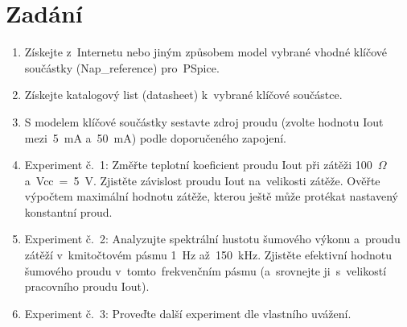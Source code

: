 \documentclass[12pt]{CLASS/protokol}
\begin{document}
\pagestyle{empty}           %
\clearpage                  %
\setcounter{page}{2}        %
\newpage                    %

\tableofcontents            %
\newpage
\clearpage\pagestyle{plain} %

\pagestyle{fancy}
\fancyhf{} %
\fancyhead[R]{\small\textcolor{black!85}{Zdroj proudu s vhodnou napěťovou referencí}} %
\fancyfoot[c]{-~\thepage~-} %
\renewcommand{\headrulewidth}{1pt}
\renewcommand{\footrulewidth}{1pt}


\newpage
\section{Zadání}\label{sec:zadani}
    \begin{enumerate}[leftmargin=.6cm]
        \item Získejte z~Internetu nebo jiným způsobem model vybrané vhodné klíčové součástky (Nap\_reference) pro~PSpice.
        \item Získejte katalogový list (datasheet) k~vybrané klíčové součástce.
        \item S modelem klíčové součástky sestavte zdroj proudu (zvolte hodnotu Iout mezi~5~mA a~50~mA) podle doporučeného zapojení.
        \item Experiment č.~1: Změřte teplotní koeficient proudu Iout při zátěži 100~$\Omega$ a~Vcc~=~5~V. Zjistěte závislost proudu Iout na~velikosti zátěže. Ověřte výpočtem maximální hodnotu zátěže, kterou ještě může protékat nastavený konstantní proud.
        \item Experiment č.~2: Analyzujte spektrální hustotu šumového výkonu a~proudu zátěží v~kmitočtovém pásmu 1~Hz až~150~kHz. Zjistěte efektivní hodnotu šumového proudu v~tomto~frekvenčním pásmu (a~srovnejte ji~s~velikostí pracovního proudu Iout).
        \item Experiment č.~3: Proveďte další experiment dle vlastního uvážení.
    \end{enumerate}
\end{document}
